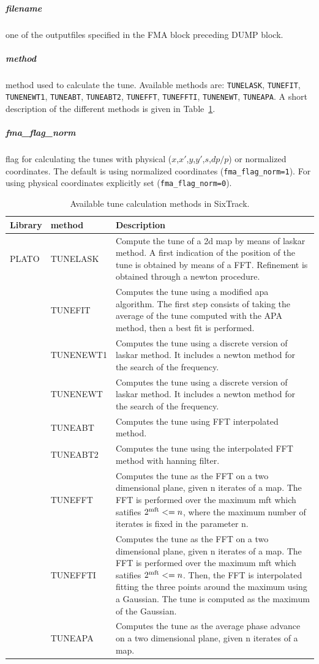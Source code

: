 \documentclass[a4paper,11pt]{report}
\begin{document}
\subparagraph{filename}
one of the outputfiles specified in the FMA block preceding DUMP block.
\subparagraph{method}
method used to calculate the tune. Available methods are: \verb|TUNELASK|, \verb|TUNEFIT|, \verb|TUNENEWT1|, \verb|TUNEABT|, \verb|TUNEABT2|, \verb|TUNEFFT|, \verb|TUNEFFTI|, \verb|TUNENEWT|, \verb|TUNEAPA|. A short description of the different methods is given in Table~\ref{fma:tab:1}.
\subparagraph{fma\_flag\_norm}
flag for calculating the tunes with physical ($x$,$x'$,$y$,$y'$,$s$,$dp/p$) or normalized coordinates. The default is using normalized coordinates (\verb|fma_flag_norm=1|). For using physical coordinates explicitly set (\verb|fma_flag_norm=0|).

\begin{table}[H]
	\begin{center}
		\caption{Available tune calculation methods in SixTrack.}
		\label{fma:tab:1}
		\begin{tabularx}{\textwidth}{|l|l|X|}
			\hline
\textbf{Library} & \textbf{method} & \textbf{Description} \\\hline
PLATO \cite{plato1,plato2}
& TUNELASK &	Compute the tune of a 2d map by means of laskar method. A first indication of the position of the tune is obtained by means of a FFT. Refinement is obtained through a newton procedure.\\\cline{2-3}
& TUNEFIT &	Computes the tune using a modified apa algorithm. The first step consists of taking the average of the tune computed with the APA method, then a best fit is performed.\\\cline{2-3}
& TUNENEWT1 &	Computes the tune using a discrete version of laskar method. It includes a newton method for the search of the frequency.\\\cline{2-3}
& TUNENEWT &	Computes the tune using a discrete version of laskar method. It includes a newton method for the search of the frequency.\\\cline{2-3}
& TUNEABT &	Computes the tune using FFT interpolated method.\\\cline{2-3}
& TUNEABT2 &	Computes the tune using the interpolated FFT method with hanning filter.\\\cline{2-3}
& TUNEFFT &	Computes the tune as the FFT on a two dimensional plane, given n iterates of a map. The FFT is performed over the maximum mft which satifies $2^{\rm mft} <= n$, where the maximum number of iterates is fixed in the parameter n.\\\cline{2-3}
& TUNEFFTI &	Computes the tune as the FFT on a two dimensional plane, given n iterates of a map. The FFT is performed over the maximum mft which satifies $2^{\rm mft} <= n$. Then, the FFT is interpolated fitting the three points around the maximum using a Gaussian. The tune is computed as the maximum of the Gaussian.\\\cline{2-3}
& TUNEAPA &	Computes the tune as the average phase advance on a two dimensional plane, given n iterates of a map. \\\hline
	\end{tabularx}
\end{center}
\end{table}
\end{document}
